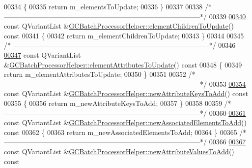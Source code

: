 \begin{DoxyCode}
00334 \textcolor{keyword}{}\{
00335   \textcolor{keywordflow}{return} m\_elementsToUpdate;
00336 \}
00337 
00338 \textcolor{comment}{/*
      --------------------------------------------------------------------------------------*/}
00339 
\hypertarget{gcbatchprocessorhelper_8cpp_source_l00340}{}\hyperlink{class_g_c_batch_processor_helper_a8fd4cac8af9a54df52a98628d5ba6fbe}{00340} \textcolor{keyword}{const} QVariantList &\hyperlink{class_g_c_batch_processor_helper_a8fd4cac8af9a54df52a98628d5ba6fbe}{GCBatchProcessorHelper::elementChildrenToUpdate}()\textcolor{keyword}{ const}
00341 \textcolor{keyword}{}\{
00342   \textcolor{keywordflow}{return} m\_elementChildrenToUpdate;
00343 \}
00344 
00345 \textcolor{comment}{/*
      --------------------------------------------------------------------------------------*/}
00346 
\hypertarget{gcbatchprocessorhelper_8cpp_source_l00347}{}\hyperlink{class_g_c_batch_processor_helper_a3b0630e9e210b2b86e58cb43d3706b73}{00347} \textcolor{keyword}{const} QVariantList &\hyperlink{class_g_c_batch_processor_helper_a3b0630e9e210b2b86e58cb43d3706b73}{GCBatchProcessorHelper::elementAttributesToUpdate}()\textcolor{keyword}{ const}
00348 \textcolor{keyword}{}\{
00349   \textcolor{keywordflow}{return} m\_elementAttributesToUpdate;
00350 \}
00351 
00352 \textcolor{comment}{/*
      --------------------------------------------------------------------------------------*/}
00353 
\hypertarget{gcbatchprocessorhelper_8cpp_source_l00354}{}\hyperlink{class_g_c_batch_processor_helper_a605ca53123f28467df39cabeb3aa65cd}{00354} \textcolor{keyword}{const} QVariantList &\hyperlink{class_g_c_batch_processor_helper_a605ca53123f28467df39cabeb3aa65cd}{GCBatchProcessorHelper::newAttributeKeysToAdd}()\textcolor{keyword}{ const}
00355 \textcolor{keyword}{}\{
00356   \textcolor{keywordflow}{return} m\_newAttributeKeysToAdd;
00357 \}
00358 
00359 \textcolor{comment}{/*
      --------------------------------------------------------------------------------------*/}
00360 
\hypertarget{gcbatchprocessorhelper_8cpp_source_l00361}{}\hyperlink{class_g_c_batch_processor_helper_abf195046fd00e629b2ce5e3bd6bcf90d}{00361} \textcolor{keyword}{const} QVariantList &\hyperlink{class_g_c_batch_processor_helper_abf195046fd00e629b2ce5e3bd6bcf90d}{GCBatchProcessorHelper::newAssociatedElementsToAdd}()\textcolor{keyword}{ const}
00362 \textcolor{keyword}{}\{
00363   \textcolor{keywordflow}{return} m\_newAssociatedElementsToAdd;
00364 \}
00365 \textcolor{comment}{/*
      --------------------------------------------------------------------------------------*/}
00366 
\hypertarget{gcbatchprocessorhelper_8cpp_source_l00367}{}\hyperlink{class_g_c_batch_processor_helper_af06d87d433f9402667f1cd654ad4b422}{00367} \textcolor{keyword}{const} QVariantList &\hyperlink{class_g_c_batch_processor_helper_af06d87d433f9402667f1cd654ad4b422}{GCBatchProcessorHelper::newAttributeValuesToAdd}()\textcolor{keyword}{ const}

\end{DoxyCode}
